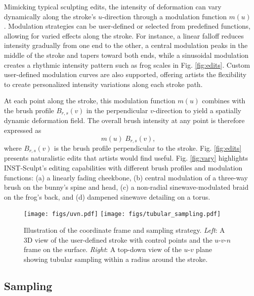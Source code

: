 Mimicking typical sculpting edits, the intensity of deformation can vary dynamically along the stroke’s $u$-direction through a modulation function $m(u)$. Modulation strategies can be user-defined or selected from predefined functions, allowing for varied effects along the stroke. For instance, a linear falloff reduces intensity gradually from one end to the other, a central modulation peaks in the middle of the stroke and tapers toward both ends, while a sinusoidal modulation creates a rhythmic intensity pattern such as frog scales in Fig. \ref{fig:edits}. Custom user-defined modulation curves are also supported, offering artists the flexibility to create personalized intensity variations along each stroke path. 

At each point along the stroke, this modulation function \(m(u)\) combines with the brush profile \(B_{r, s}(v)\) in the perpendicular \(v\)-direction to yield a spatially dynamic deformation field. The overall brush intensity at any point is therefore expressed as 
\begin{equation}
m(u) \; B_{r, s}(v),
\end{equation}
where \(B_{r, s}(v)\) is the brush profile perpendicular to the stroke. Fig. \ref{fig:edits} presents naturalistic edits that artists would find useful. Fig. \ref{fig:vary} highlights INST-Sculpt's editing capabilities with different brush profiles and modulation functions: (a) a linearly fading cheekbone, (b) central modulation of a three-way brush on the bunny’s spine and head, (c) a non-radial sinewave-modulated braid on the frog’s back, and (d) dampened sinewave detailing on a torus. 


\begin{figure}[htbp]
  \centering
   \texttt{[image: figs/uvn.pdf]}
   \texttt{[image: figs/tubular\_sampling.pdf]}

   \caption{Illustration of the coordinate frame and sampling strategy. \textit{Left}: A 3D view of the user-defined stroke with control points and the $u$-$v$-$n$ frame on the surface. \textit{Right}: A top-down view of the $u$-$v$ plane showing tubular sampling within a radius around the stroke.}
   \label{fig:sampling}
   \vspace{-0.4cm}
\end{figure}

\subsection{Sampling}
\label{sec:sampling}

